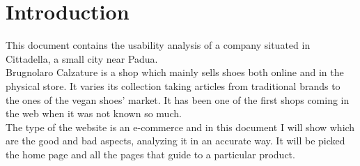 \section{Introduction}
This document contains the usability analysis of a company situated
in Cittadella, a small city near Padua.\\
Brugnolaro Calzature is a shop which mainly sells shoes both online and
in the \mbox{physical} store. It varies its collection taking articles
from traditional brands to the ones of the vegan shoes' market. 
It has been one of the first shops coming in the web when it was not
known so much.\\
The type of the website is an e-commerce and in this document I will
show which are the good and bad aspects, analyzing it in an accurate way.
It will be picked the home page and all the pages that guide to a
particular product.